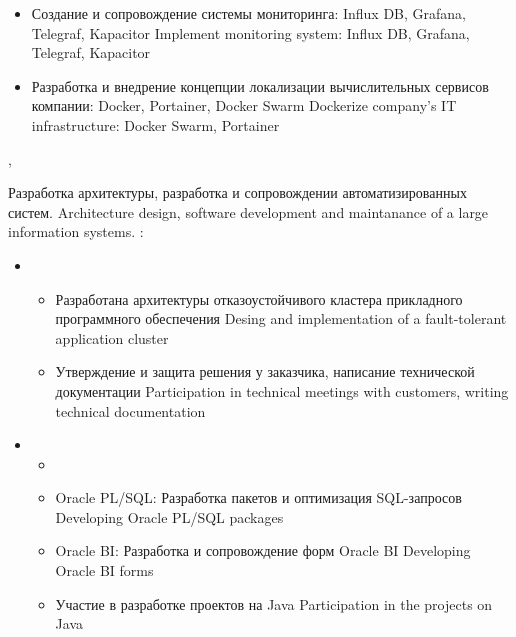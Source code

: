 \documentclass[11pt,a4paper,sans, russian]{moderncv}        %
\begin{document}
{\begin{itemize}
\begin{itemize}
				{Migration development environment from Bitbucket, TeamCity to GitLab, Jenkins}			
			\item {}
				{Создание и сопровождение системы мониторинга: Influx DB, Grafana, Telegraf, Kapacitor}
				{Implement monitoring system: Influx DB, Grafana, Telegraf, Kapacitor}
			\item {}
				{Разработка и внедрение концепции локализации вычислительных сервисов компании: Docker, Portainer, Docker Swarm}
				{Dockerize company's IT infrastructure: Docker Swarm, Portainer}
		\end{itemize}
	\end{itemize}
}


{\protect{}}
{\citymoscow, \country}
{}
{
	{Разработка архитектуры, разработка и сопровождении автоматизированных систем.}
	{Architecture design, software development and maintanance of a large information systems.}
  \newline{}
	\achievements:
	\begin{itemize}
	\item {}
		\begin{itemize}
		\item {}
			{Разработана архитектуры отказоустойчивого кластера прикладного программного обеспечения}
			{Desing and implementation of a fault-tolerant application cluster}
		\item {}
			{Утверждение и защита решения у заказчика, написание технической документации}
			{Participation in technical meetings with customers, writing technical documentation}
		\end{itemize}
	\item {}
		\begin{itemize}
			\item {}
			\item {}
				{Oracle PL/SQL: Разработка пакетов и оптимизация SQL-запросов}
				{Developing Oracle PL/SQL packages}
			\item {}
				{Oracle BI: Разработка и сопровождение форм Oracle BI}
				{Developing Oracle BI forms}
			\item {}
				{Участие в разработке проектов на Java}
				{Participation in the projects on Java}

\end{itemize}
\end{itemize}}
\end{document}
